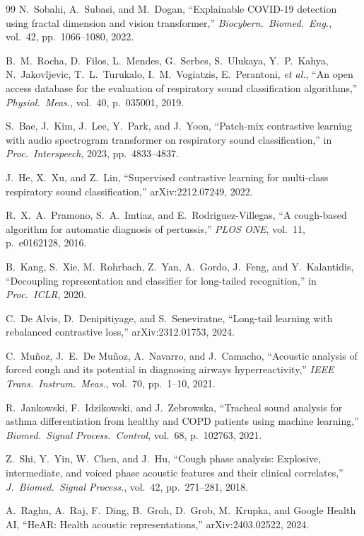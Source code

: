 \documentclass[journal]{IEEEtran}
\begin{document}
\begin{thebibliography}{99}
N.~Sobahi, A.~Subasi, and M.~Dogan,
``Explainable COVID-19 detection using fractal dimension and vision
transformer,''
\emph{Biocybern.\ Biomed.\ Eng.}, vol.~42, pp.~1066--1080, 2022.

B.~M.~Rocha, D.~Filos, L.~Mendes, G.~Serbes, S.~Ulukaya,
Y.~P.~Kahya, N.~Jakovljevic, T.~L.~Turukalo, I.~M.~Vogiatzis,
E.~Perantoni, \textit{et al.},
``An open access database for the evaluation of respiratory sound
classification algorithms,'' \emph{Physiol.\ Meas.},
vol.~40, p.~035001, 2019.

S.~Bae, J.~Kim, J.~Lee, Y.~Park, and J.~Yoon,
``Patch-mix contrastive learning with audio spectrogram transformer on
respiratory sound classification,''
in \emph{Proc.\ Interspeech}, 2023, pp.~4833--4837.

J.~He, X.~Xu, and Z.~Lin,
``Supervised contrastive learning for multi-class respiratory sound
classification,'' arXiv:2212.07249, 2022.

R.~X.~A.~Pramono, S.~A.~Imtiaz, and E.~Rodriguez-Villegas,
``A cough-based algorithm for automatic diagnosis of pertussis,''
\emph{PLOS ONE}, vol.~11, p.~e0162128, 2016.

B.~Kang, S.~Xie, M.~Rohrbach, Z.~Yan, A.~Gordo, J.~Feng, and
Y.~Kalantidis,
``Decoupling representation and classifier for long-tailed recognition,''
in \emph{Proc.\ ICLR}, 2020.

C.~De Alvis, D.~Denipitiyage, and S.~Seneviratne,
``Long-tail learning with rebalanced contrastive loss,''
arXiv:2312.01753, 2024.

C.~Muñoz, J.~E.~De Muñoz, A.~Navarro, and J.~Camacho,
``Acoustic analysis of forced cough and its potential in diagnosing
airways hyperreactivity,''
\emph{IEEE Trans.\ Instrum.\ Meas.}, vol.~70, pp.~1--10, 2021.

R.~Jankowski, F.~Idzikowski, and J.~Zebrowska,
``Tracheal sound analysis for asthma differentiation from healthy
and COPD patients using machine learning,''
\emph{Biomed.\ Signal Process.\ Control}, vol.~68, p.~102763, 2021.

Z.~Shi, Y.~Yin, W.~Chen, and J.~Hu,
``Cough phase analysis: Explosive, intermediate, and voiced phase
acoustic features and their clinical correlates,''
\emph{J.\ Biomed.\ Signal Process.}, vol.~42, pp.~271--281, 2018.

A.~Raghu, A.~Raj, F.~Ding, B.~Groh, D.~Grob, M.~Krupka,
and Google Health AI,
``HeAR: Health acoustic representations,'' arXiv:2403.02522, 2024.


\end{thebibliography}
\end{document}

